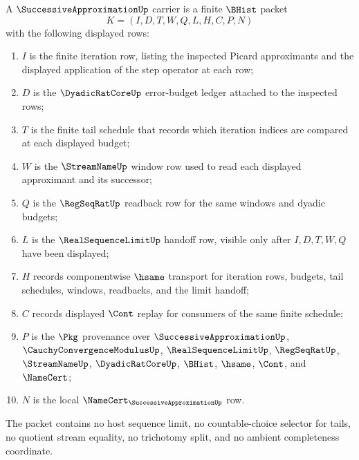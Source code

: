 \begin{definition}
\label{def:successive-approximation-carrier}
A $\SuccessiveApproximationUp$ carrier is a finite $\BHist$ packet
$$
K=(I,D,T,W,Q,L,H,C,P,N)
$$
with the following displayed rows:
\begin{enumerate}
\item $I$ is the finite iteration row, listing the inspected Picard approximants and the displayed application of the step operator at each row;
\item $D$ is the $\DyadicRatCoreUp$ error-budget ledger attached to the inspected rows;
\item $T$ is the finite tail schedule that records which iteration indices are compared at each displayed budget;
\item $W$ is the $\StreamNameUp$ window row used to read each displayed approximant and its successor;
\item $Q$ is the $\RegSeqRatUp$ readback row for the same windows and dyadic budgets;
\item $L$ is the $\RealSequenceLimitUp$ handoff row, visible only after $I,D,T,W,Q$ have been displayed;
\item $H$ records componentwise $\hsame$ transport for iteration rows, budgets, tail schedules, windows, readbacks, and the limit handoff;
\item $C$ records displayed $\Cont$ replay for consumers of the same finite schedule;
\item $P$ is the $\Pkg$ provenance over $\SuccessiveApproximationUp$, $\CauchyConvergenceModulusUp$, $\RealSequenceLimitUp$, $\RegSeqRatUp$, $\StreamNameUp$, $\DyadicRatCoreUp$, $\BHist$, $\hsame$, $\Cont$, and $\NameCert$;
\item $N$ is the local $\NameCert_{\SuccessiveApproximationUp}$ row.
\end{enumerate}
The packet contains no host sequence limit, no countable-choice selector for tails, no quotient stream equality, no trichotomy split, and no ambient completeness coordinate.
\end{definition}

